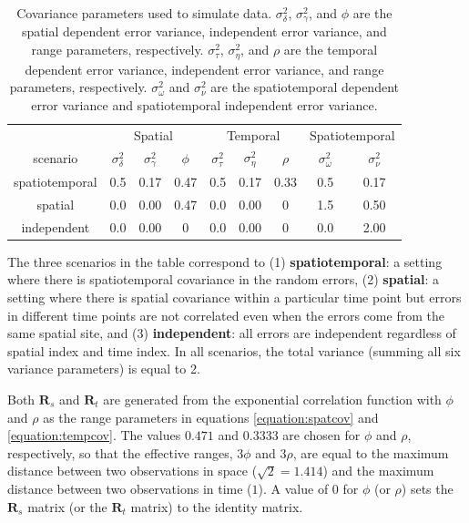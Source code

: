 \documentclass[]{interact}
\theoremstyle{plain}%
\theoremstyle{definition}
\theoremstyle{remark}
\begin{document}
\begin{table}[H]

\caption{\label{tab:simparmtab}Covariance parameters used to simulate data. $\sigma^2_{\delta}$, $\sigma^2_{\gamma}$, and $\phi$ are the spatial dependent error variance, independent error variance, and range parameters, respectively. $\sigma^2_{\tau}$, $\sigma^2_{\eta}$, and $\rho$ are the temporal dependent error variance, independent error variance, and range parameters, respectively. $\sigma^2_{\omega}$ and $\sigma^2_{\nu}$ are the spatiotemporal dependent error variance and spatiotemporal independent error variance.}
\centering
\begin{tabular}[t]{ccccccccc}
\toprule
\multicolumn{1}{c}{ } & \multicolumn{3}{c}{Spatial} & \multicolumn{3}{c}{Temporal} & \multicolumn{2}{c}{Spatiotemporal} \\
\cmidrule(l{3pt}r{3pt}){2-4} \cmidrule(l{3pt}r{3pt}){5-7} \cmidrule(l{3pt}r{3pt}){8-9}
scenario & $\sigma^2_{\delta}$ & $\sigma^2_{\gamma}$ & $\phi$ & $\sigma^2_{\tau}$ & $\sigma^2_{\eta}$ & $\rho$ & $\sigma^2_{\omega}$ & $\sigma^2_{\nu}$\\
\midrule
spatiotemporal & 0.5 & 0.17 & 0.47 & 0.5 & 0.17 & 0.33 & 0.5 & 0.17\\
spatial & 0.0 & 0.00 & 0.47 & 0.0 & 0.00 & 0 & 1.5 & 0.50\\
independent & 0.0 & 0.00 & 0 & 0.0 & 0.00 & 0 & 0.0 & 2.00\\
\bottomrule
\end{tabular}
\end{table}

The three scenarios in the table correspond to (1)
\textbf{spatiotemporal}: a setting where there is spatiotemporal
covariance in the random errors, (2) \textbf{spatial}: a setting where
there is spatial covariance within a particular time point but errors in
different time points are not correlated even when the errors come from
the same spatial site, and (3) \textbf{independent}: all errors are
independent regardless of spatial index and time index. In all
scenarios, the total variance (summing all six variance parameters) is
equal to 2.

Both \(\mathbf{R}_{s}\) and \(\mathbf{R}_t\) are generated from the
exponential correlation function with \(\phi\) and \(\rho\) as the range
parameters in equations \ref{equation:spatcov} and
\ref{equation:tempcov}. The values \(0.471\) and \(0.3333\) are chosen
for \(\phi\) and \(\rho\), respectively, so that the effective ranges,
\(3 \phi\) and \(3 \rho\), are equal to the maximum distance between two
observations in space (\(\sqrt2 = 1.414\)) and the maximum distance
between two observations in time (\(1\)). A value of 0 for \(\phi\) (or
\(\rho\)) sets the \(\mathbf{R}_{s}\) matrix (or the \(\mathbf{R}_t\)
matrix) to the identity matrix.
\end{document}
